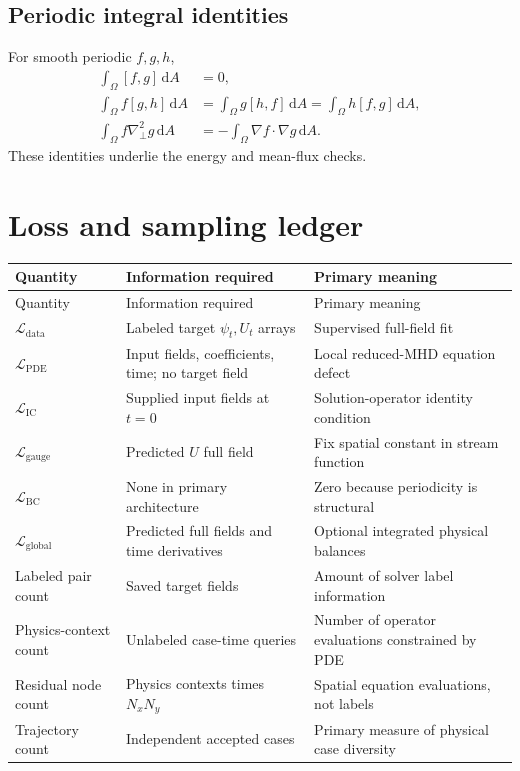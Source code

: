 \documentclass[11pt]{article}
\newcommand{\dd}{\mathrm{d}}
\newcommand{\Lap}{\nabla_\perp^2}
\newcommand{\Ldata}{\mathcal{L}_{\mathrm{data}}}
\newcommand{\Lpde}{\mathcal{L}_{\mathrm{PDE}}}
\newcommand{\Lic}{\mathcal{L}_{\mathrm{IC}}}
\newcommand{\Lbc}{\mathcal{L}_{\mathrm{BC}}}
\newcommand{\Lglobal}{\mathcal{L}_{\mathrm{global}}}
\newcommand{\Lgauge}{\mathcal{L}_{\mathrm{gauge}}}
\begin{document}
\subsection{Periodic integral identities}
For smooth periodic $f,g,h$,
\begin{align}
\int_\Omega[f,g] \,\dd A&=0,\\
\int_\Omega f[g,h] \,\dd A
&=\int_\Omega g[h,f] \,\dd A
=\int_\Omega h[f,g] \,\dd A,\\
\int_\Omega f\Lap g\,\dd A
&=-\int_\Omega \nabla f\cdot\nabla g\,\dd A.
\end{align}
These identities underlie the energy and mean-flux checks.

\section{Loss and sampling ledger}
\label{app:lossledger}

\begin{longtable}{p{}p{}p{}}
\toprule
Quantity & Information required & Primary meaning \\
\midrule
\endfirsthead
\toprule
Quantity & Information required & Primary meaning \\
\midrule
\endhead
$\Ldata$ & Labeled target $\psi_t,U_t$ arrays & Supervised full-field fit \\
$\Lpde$ & Input fields, coefficients, time; no target field & Local reduced-MHD equation defect \\
$\Lic$ & Supplied input fields at $t=0$ & Solution-operator identity condition \\
$\Lgauge$ & Predicted $U$ full field & Fix spatial constant in stream function \\
$\Lbc$ & None in primary architecture & Zero because periodicity is structural \\
$\Lglobal$ & Predicted full fields and time derivatives & Optional integrated physical balances \\
Labeled pair count & Saved target fields & Amount of solver label information \\
Physics-context count & Unlabeled case-time queries & Number of operator evaluations constrained by PDE \\
Residual node count & Physics contexts times $N_xN_y$ & Spatial equation evaluations, not labels \\
Trajectory count & Independent accepted cases & Primary measure of physical case diversity \\
\bottomrule
\end{longtable}
\end{document}
